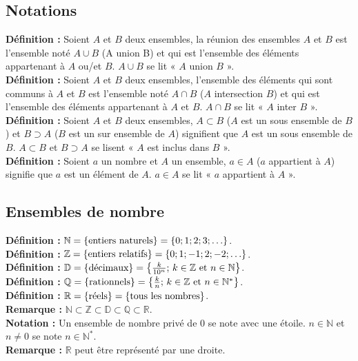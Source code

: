 \documentclass[a4paper,titlepage]{article}
\let\oldleft\left
\renewcommand{\left}{\mathopen{}\mathclose\bgroup\oldleft}
\let\oldright\right
\renewcommand{\right}{\aftergroup\egroup\oldright}
\begin{document}
    \subsection{Notations}
        \textbf{Définition :} Soient $A$ et $B$ deux ensembles, la réunion des ensembles $A$ et $B$ est l’ensemble noté $A\cup B$ (A union B) et qui est l’ensemble des éléments appartenant à $A$ ou/et $B$. $A\cup B$ se lit « $A$ union $B$ ».
        \\
        \textbf{Définition :} Soient $A$ et $B$ deux ensembles, l’ensemble des éléments qui sont communs à $A$ et $B$ est l’ensemble noté $A\cap B$ ($A$ intersection $B$) et qui est l’ensemble des éléments appartenant à $A$ et $B$. $A\cap B$ se lit « $A$ inter $B$ ».
        \\
        \textbf{Définition :} Soient $A$ et $B$ deux ensembles, $A\subset B$ ($A$ est un sous ensemble de $B$) et $B\supset A$ ($B$ est un sur ensemble de $A$) signifient que $A$ est un sous ensemble de $B$. $A\subset B$ et $B\supset A$ se lisent « $A$ est inclus dans $B$ ».
        \\
        \textbf{Définition :} Soient $a$ un nombre et $A$ un ensemble, $a\in A$ ($a$ appartient à $A$) signifie que $a$ est un élément de $A$. $a\in A$ se lit « $a$ appartient à $A$ ».
    \subsection{Ensembles de nombre}
        \textbf{Définition :} $\mathbb{N}=\left\{\text{entiers naturels}\right\}=\left\{0;1;2;3;\ldots\right\}$.
        \\
        \textbf{Définition :} $\mathbb{Z}=\left\{\text{entiers relatifs}\right\}=\left\{0;1;-1;2;-2;\ldots\right\}$.
        \\
        \textbf{Définition :} $\mathbb{D}=\left\{\text{décimaux}\right\}=\left\{\frac{k}{10^{n}}\text{; }k\in\mathbb{Z}\text{ et }n\in\mathbb{N}\right\}$.
        \\
        \textbf{Définition :} $\mathbb{Q}=\left\{\text{rationnels}\right\}=\left\{\frac{k}{n}\text{; }k\in\mathbb{Z}\text{ et }n\in\mathbb{N}^{*}\right\}$.
        \\
        \textbf{Définition :} $\mathbb{R}=\left\{\text{réels}\right\}=\left\{\text{tous les nombres}\right\}$.
        \\
        \textbf{Remarque :} $\mathbb{N}\subset\mathbb{Z}\subset\mathbb{D}\subset\mathbb{Q}\subset\mathbb{R}$.
        \\
        \textbf{Notation :} Un ensemble de nombre privé de $0$ se note avec une étoile. $n\in\mathbb{N}$ et $n\neq 0$ se note $n\in\mathbb{N}^{*}$.
        \\
        \textbf{Remarque :} $\mathbb{R}$ peut être représenté par une droite.
\end{document}
